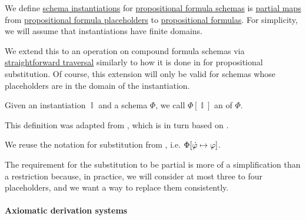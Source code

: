 \begin{definition}\label{def:propositional_schema_instantiation}\mimprovised
  We define \hyperref[con:schemas_and_instances]{schema instantiations} for \hyperref[def:propositional_formula_schema]{propositional formula schemas} is \hyperref[def:set_valued_map/partial]{partial maps} from \hyperref[def:propositional_formula_schema]{propositional formula placeholders} to \hyperref[def:propositional_syntax/formula]{propositional formulas}. For simplicity, we will assume that instantiations have finite domains.

  We extend this to an operation on compound formula schemas via \hyperref[rem:straightforward_traversal]{straightforward traversal} similarly to how it is done in  for propositional substitution. Of course, this extension will only be valid for schemas whose placeholders are in the domain of the instantiation.

  Given an instantiation \( \BbbI \) and a schema \( \Phi \), we call \( \Phi[\BbbI] \) an  of \( \Phi \).
\end{definition}
\begin{comments}
  \item This definition was adapted from , which is in turn based on \cite[def. 3.1.3]{CitkinMuravitsky2022ConsequenceRelations}.

  \item We reuse the notation for substitution from , i.e. \( \Phi[\dot{\varphi} \mapsto \varphi] \).

  \item The requirement for the substitution to be partial is more of a simplification than a restriction because, in practice, we will consider at most three to four placeholders, and we want a way to replace them consistently.
\end{comments}

\paragraph{Axiomatic derivation systems}

